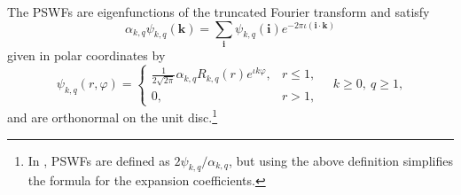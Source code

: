 \documentclass[english,11pt]{article}
\newcommand{\1}{\mathbf{1}}
\newcommand{\mb}{\mathbf}
\newcommand{\TODO}[1]{{\color{red}{[#1]}}}
\numberwithin{equation}{section}
\theoremstyle{plain}
\theoremstyle{definition}
\theoremstyle{remark}
\theoremstyle{plain}
\theoremstyle{remark}
\theoremstyle{plain}
\theoremstyle{plain}
\newcommand{\be}{\begin{equation}}
\newcommand{\ee}{\end{equation}}
\begin{document}
The PSWFs are eigenfunctions of the truncated Fourier transform and satisfy \TODO{approximate} \TODO{generate the Gram matrix of the discrete approximation}
\be\label{eq:PSWF_defn_eq}
\alpha_{k,q}\psi_{k,q}(\mb k) = \sum_{\mb i}\psi_{k,q}(\mb i)e^{-2\pi \iota (\mb i\cdot\mb k)}
\ee
given in polar coordinates by
\[ \psi_{k,q}(r,\varphi) = \left\{\begin{array}{ll} \frac{1}{2\sqrt{2\pi}}\alpha_{k,q}R_{k,q}(r)e^{\iota k\varphi}, & r\leq 1,\\ 0, & r>1,\end{array}\right. \quad k\geq 0,\ q\geq 1,\]
and are orthonormal on the unit disc.\footnote{In \cite{landa2017steerable}, PSWFs are defined as $2\psi_{k,q}/\alpha_{k,q}$, but using the above definition simplifies the formula for the expansion coefficients.}
\end{document}
